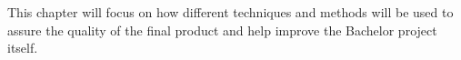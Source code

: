 This chapter will focus on how different techniques and methods will be used to assure the quality of the final product and help improve the Bachelor project itself.